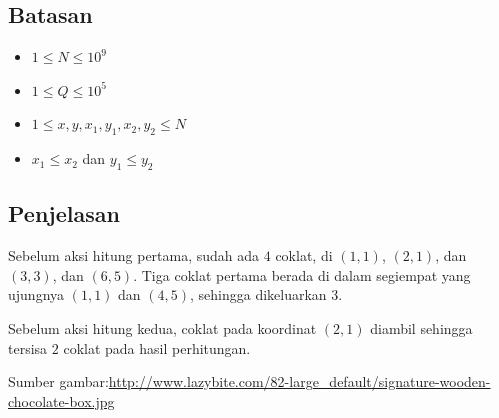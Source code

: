 \documentclass{article}
\begin{document}
\subsection*{Batasan}

\begin{itemize}
  \item $1 \leq N \leq 10^9$
  \item $1 \leq Q \leq 10^5$
  \item $1 \leq x, y, x_1, y_1, x_2, y_2 \leq N$
  \item $x_1 \leq x_2$ dan $y_1 \leq y_2$
\end{itemize}

\subsection*{Penjelasan}

\par\noindent Sebelum aksi hitung pertama, sudah ada $4$ coklat, di $(1,1)$, $(2,1)$, dan $(3,3)$, dan $(6,5)$. Tiga coklat pertama berada di dalam segiempat yang ujungnya $(1,1)$ dan $(4,5)$, sehingga dikeluarkan $3$.

\par\noindent Sebelum aksi hitung kedua, coklat pada koordinat $(2,1)$ diambil sehingga tersisa $2$ coklat pada hasil perhitungan.

\par\noindent Sumber gambar:\url{http://www.lazybite.com/82-large_default/signature-wooden-chocolate-box.jpg}
\end{document}
